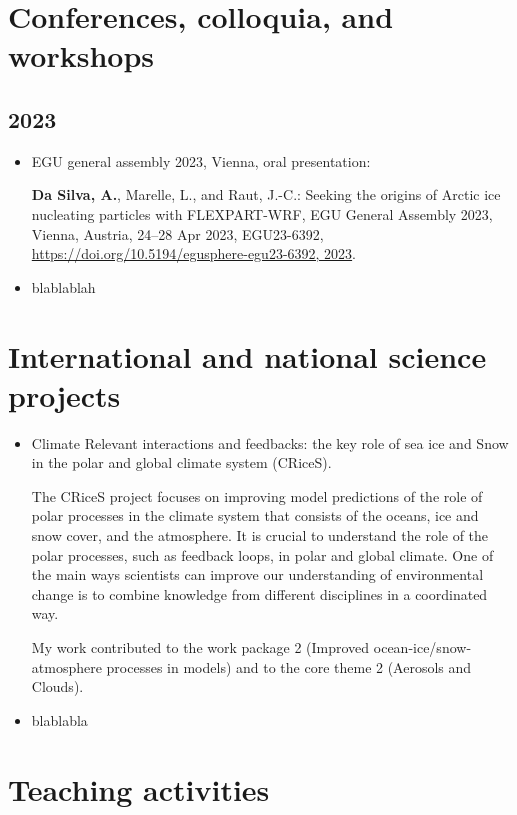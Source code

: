 \section*{Conferences, colloquia, and workshops}
    \subsection*{2023}
    \begin{itemize}
        \item EGU general assembly 2023, Vienna, oral presentation:

        \textbf{Da Silva, A.}, Marelle, L., and Raut, J.-C.: Seeking the origins of Arctic ice nucleating particles with FLEXPART-WRF, EGU General Assembly 2023, Vienna, Austria, 24–28 Apr 2023, EGU23-6392, \url{https://doi.org/10.5194/egusphere-egu23-6392, 2023}. 

        \item blablablah 
    \end{itemize}


\section*{International and national science projects}
    \begin{itemize}
        \item Climate Relevant interactions and feedbacks: the key role of sea ice and Snow in the polar and global climate system (CRiceS).

            The CRiceS project focuses on improving model predictions of the role of polar processes in the climate system that consists of the oceans, ice and snow cover, and the atmosphere. It is crucial to understand the role of the polar processes, such as feedback loops, in polar and global climate. One of the main ways scientists can improve our understanding of environmental change is to combine knowledge from different disciplines in a coordinated way.

            My work contributed to the work package 2 (Improved ocean-ice/snow-atmosphere processes in models) and to the core theme 2 (Aerosols and Clouds).

        \item  blablabla
    \end{itemize}


\section*{Teaching activities}
